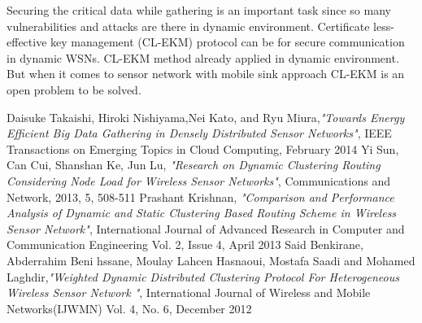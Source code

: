 \documentclass[MTech]{iitmdiss}
\begin{document}
Securing the critical data while gathering is an important task since so many vulnerabilities and attacks are there in dynamic environment. Certificate less-effective key management (CL-EKM) protocol can be  for secure communication in dynamic WSNs. CL-EKM method already applied in dynamic environment. But when it comes to sensor network with mobile sink approach CL-EKM is an open problem to be solved. 
\pagebreak
\pagestyle{empty}
\begin{singlespace}
  \begin{thebibliography}{1}
\bibitem{}
Daisuke Takaishi, Hiroki Nishiyama,Nei Kato, and Ryu Miura,\textit{"Towards Energy Efficient Big Data Gathering in Densely Distributed Sensor Networks"}, IEEE Transactions on Emerging Topics in Cloud Computing, February 2014
\bibitem{}
Yi Sun, Can Cui, Shanshan Ke, Jun Lu, \textit{"Research on Dynamic Clustering Routing Considering 
Node Load for Wireless Sensor Networks"}, Communications and Network, 2013, 5, 508-511
\bibitem{}
Prashant Krishnan, \textit{"Comparison and Performance Analysis of Dynamic 
and Static Clustering Based Routing Scheme in 
Wireless Sensor Network"}, International Journal of Advanced Research in Computer and Communication Engineering Vol. 2, Issue 4, April 2013
\bibitem{}
Said Benkirane, Abderrahim Beni hssane, Moulay Lahcen Hasnaoui, Mostafa Saadi and Mohamed Laghdir,\textit{"Weighted Dynamic Distributed Clustering 
Protocol For Heterogeneous Wireless 
Sensor Network
"}, International Journal of Wireless and Mobile Networks(IJWMN) Vol. 4, No. 6, December 2012


\end{thebibliography}
\end{singlespace}
\end{document}
